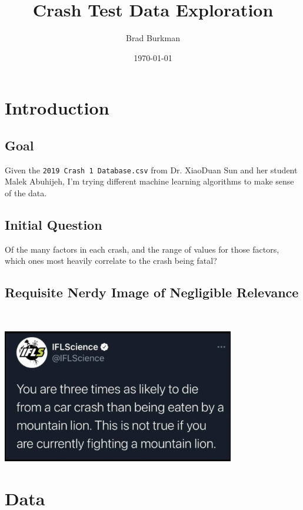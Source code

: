 \documentclass[11pt]{article}
\title{Crash Test Data Exploration}
\author{Brad Burkman}
\date{\today}
\begin{document}
\setlength{\parindent}{20pt}
\begin{spacing}{1.2}
\maketitle

\section{Introduction}

\subsection{Goal}

Given the \verb|2019 Crash 1 Database.csv| from Dr. XiaoDuan Sun and her student Malek Abuhijeh, I'm trying different machine learning algorithms to make sense of the data.  

\subsection{Initial Question}

Of the many factors in each crash, and the range of values for those factors, which ones most heavily correlate to the crash being fatal?

\subsection{Requisite Nerdy Image of Negligible Relevance}

\

\includegraphics[width=4in]{Mountain_Lion.png}

\tableofcontents

\section{Data}


\end{spacing}
\end{document}
